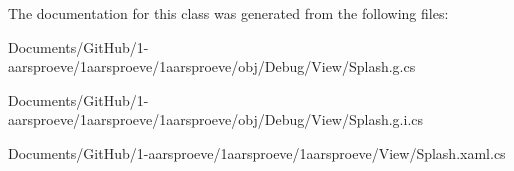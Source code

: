 The documentation for this class was generated from the following files\+:\begin{DoxyCompactItemize}
\item 
Documents/\+Git\+Hub/1-\/aarsproeve/1aarsproeve/1aarsproeve/obj/\+Debug/\+View/Splash.\+g.\+cs\item 
Documents/\+Git\+Hub/1-\/aarsproeve/1aarsproeve/1aarsproeve/obj/\+Debug/\+View/Splash.\+g.\+i.\+cs\item 
Documents/\+Git\+Hub/1-\/aarsproeve/1aarsproeve/1aarsproeve/\+View/Splash.\+xaml.\+cs\end{DoxyCompactItemize}
